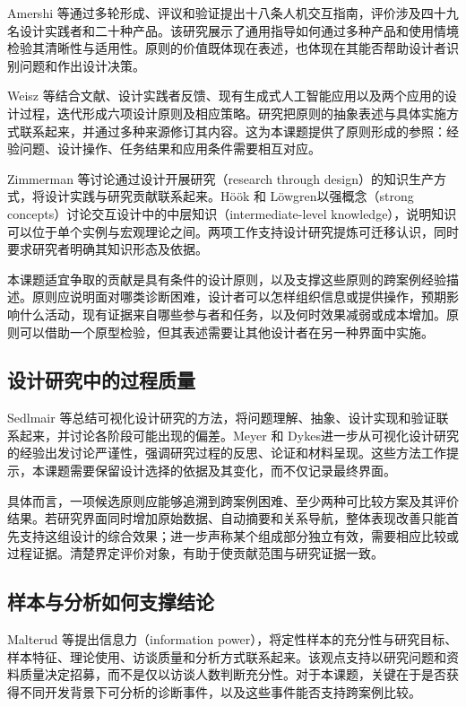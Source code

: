 Amershi 等\cite{ref48}通过多轮形成、评议和验证提出十八条人机交互指南，评价涉及四十九名设计实践者和二十种产品。该研究展示了通用指导如何通过多种产品和使用情境检验其清晰性与适用性。原则的价值既体现在表述，也体现在其能否帮助设计者识别问题和作出设计决策。

Weisz 等\cite{ref66}结合文献、设计实践者反馈、现有生成式人工智能应用以及两个应用的设计过程，迭代形成六项设计原则及相应策略。研究把原则的抽象表述与具体实施方式联系起来，并通过多种来源修订其内容。这为本课题提供了原则形成的参照：经验问题、设计操作、任务结果和应用条件需要相互对应。

Zimmerman 等\cite{zimmerman2007rtd}讨论通过设计开展研究（research through design）的知识生产方式，将设计实践与研究贡献联系起来。Höök 和 Löwgren\cite{hook2012strong}以强概念（strong concepts）讨论交互设计中的中层知识（intermediate-level knowledge），说明知识可以位于单个实例与宏观理论之间。两项工作支持设计研究提炼可迁移认识，同时要求研究者明确其知识形态及依据。

本课题适宜争取的贡献是具有条件的设计原则，以及支撑这些原则的跨案例经验描述。原则应说明面对哪类诊断困难，设计者可以怎样组织信息或提供操作，预期影响什么活动，现有证据来自哪些参与者和任务，以及何时效果减弱或成本增加。原则可以借助一个原型检验，但其表述需要让其他设计者在另一种界面中实施。

\subsection{设计研究中的过程质量}

Sedlmair 等\cite{sedlmair2012design}总结可视化设计研究的方法，将问题理解、抽象、设计实现和验证联系起来，并讨论各阶段可能出现的偏差。Meyer 和 Dykes\cite{meyer2020rigor}进一步从可视化设计研究的经验出发讨论严谨性，强调研究过程的反思、论证和材料呈现。这些方法工作提示，本课题需要保留设计选择的依据及其变化，而不仅记录最终界面。

具体而言，一项候选原则应能够追溯到跨案例困难、至少两种可比较方案及其评价结果。若研究界面同时增加原始数据、自动摘要和关系导航，整体表现改善只能首先支持这组设计的综合效果；进一步声称某个组成部分独立有效，需要相应比较或过程证据。清楚界定评价对象，有助于使贡献范围与研究证据一致。

\subsection{样本与分析如何支撑结论}

Malterud 等\cite{malterud2016information}提出信息力（information power），将定性样本的充分性与研究目标、样本特征、理论使用、访谈质量和分析方式联系起来。该观点支持以研究问题和资料质量决定招募，而不是仅以访谈人数判断充分性。对于本课题，关键在于是否获得不同开发背景下可分析的诊断事件，以及这些事件能否支持跨案例比较。


